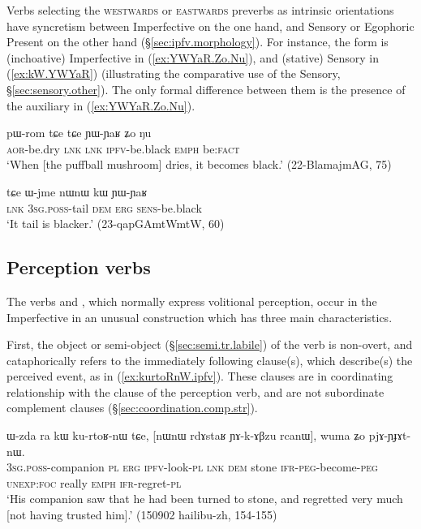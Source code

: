Verbs selecting the \textsc{westwards} or \textsc{eastwards} preverbs as intrinsic orientations have syncretism between Imperfective on the one hand, and Sensory or Egophoric Present on the other hand (§\ref{sec:ipfv.morphology}). For instance, the form  is (inchoative) Imperfective in (\ref{ex:YWYaR.Zo.Nu}), and (stative) Sensory in (\ref{ex:kW.YWYaR}) (illustrating the comparative use of the Sensory, §\ref{sec:sensory.other}). The only formal difference between them is the presence of the auxiliary  in (\ref{ex:YWYaR.Zo.Nu}).

\begin{exe}
\ex \label{ex:YWYaR.Zo.Nu}
\gll  pɯ-rom tɕe tɕe ɲɯ-ɲaʁ ʑo ŋu \\
\textsc{aor}-be.dry \textsc{lnk} \textsc{lnk} \textsc{ipfv}-be.black \textsc{emph} be:\textsc{fact} \\
\glt `When [the puffball mushroom] dries, it becomes black.' (22-BlamajmAG, 75)
\end{exe}

\begin{exe}
\ex \label{ex:kW.YWYaR}
\gll  tɕe ɯ-jme nɯnɯ kɯ ɲɯ-ɲaʁ \\
\textsc{lnk} \textsc{3sg}.\textsc{poss}-tail \textsc{dem} \textsc{erg} \textsc{sens}-be.black \\
\glt `It tail is blacker.' (23-qapGAmtWmtW, 60)
\end{exe}


\subsection{Perception verbs} \label{sec:ipfv.perception}
The verbs  and , which normally express volitional perception, occur in the Imperfective in an unusual construction which has three main characteristics. 

First, the object or semi-object (§\ref{sec:semi.tr.labile}) of the verb is non-overt, and cataphorically refers to the immediately following clause(s), which describe(s) the perceived event, as in (\ref{ex:kurtoRnW.ipfv}). These clauses are in coordinating relationship with the clause of the perception verb, and are not subordinate complement clauses (§\ref{sec:coordination.comp.str}).

\begin{exe}
\ex \label{ex:kurtoRnW.ipfv}
\gll ɯ-zda ra kɯ ku-rtoʁ-nɯ tɕe, [nɯnɯ rdɤstaʁ ɲɤ-k-ɤβzu rcanɯ], wuma ʑo pjɤ-ɲɟɤt-nɯ. \\
\textsc{3sg}.\textsc{poss}-companion \textsc{pl} \textsc{erg} \textsc{ipfv}-look-\textsc{pl} \textsc{lnk} \textsc{dem} stone \textsc{ifr}-\textsc{peg}-become-\textsc{peg} \textsc{unexp}:\textsc{foc} really \textsc{emph} \textsc{ifr}-regret-\textsc{pl} \\
\glt `His companion saw that he had been turned to stone, and regretted very much [not having trusted him].' (150902 hailibu-zh, 154-155)
\end{exe}

